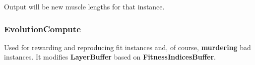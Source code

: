         Output will be new muscle lengths for that instance.

    \subsubsection{\textbf{\large EvolutionCompute}}
        Used for rewarding and reproducing fit instances and, of course, \textbf{murdering} bad instances. It modifies \textbf{LayerBuffer} based on \textbf{FitnessIndicesBuffer}.
